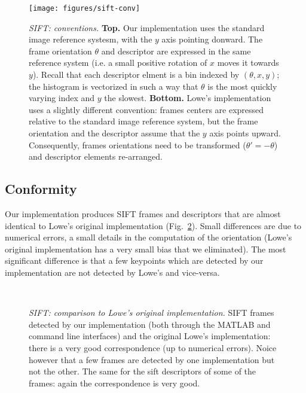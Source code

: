 \documentclass{article}
\begin{document}
\begin{figure}
\begin{center}
\texttt{[image: figures/sift-conv]}
\end{center}
\caption{{\em SIFT: conventions.} {\bf Top.} Our implementation uses
  the standard image reference systesm, with the $y$ axis pointing
  donward. The frame orientation $\theta$ and descriptor are expressed
  in the same reference system (i.e. a small positive rotation of $x$
  moves it towards $y$). Recall that each descriptor elment is a bin
  indexed by $(\theta,x,y)$; the histogram is vectorized in such a way
  that $\theta$ is the most quickly varying index and $y$ the
  slowest. {\bf Bottom.} Lowe's implementation uses a slightly
  different convention: frames centers are expressed relative to the
  standard image reference system, but the frame orientation and the
  descriptor assume that the $y$ axis points upward. Consequently,
  frames orientations need to be transformed ($\theta'=-\theta$) and
  descriptor elements re-arranged.}
\label{fig:sift-conv}
\end{figure}

\subsection{Conformity}\label{sift.conformity}

Our implementation produces SIFT frames and descriptors that are
almost identical to Lowe's original implementation
(Fig.~\ref{fig:sift-conformity}). Small differences are due to
numerical errors, a small details in the computation of the
orientation (Lowe's original implementation has a very small bias that
we eliminated). The most significant difference is that a few
keypoints which are detected by our implementation are not detected by
Lowe's and vice-versa.

\begin{figure}
\begin{center}
\hfill
{}\\
\end{center}
\caption{ {\em SIFT: comparison to Lowe's original implementation.}
   SIFT frames detected by our
  implementation (both through the MATLAB and command line interfaces)
  and the original Lowe's implementation: there is a very good
  correspondence (up to numerical errors).  Noice however that a few
  frames are detected by one implementation but not the other.
   The same for the sift descriptors of some
  of the frames: again the correspondence is very good.}
\label{fig:sift-conformity}
\end{figure}
\end{document}
